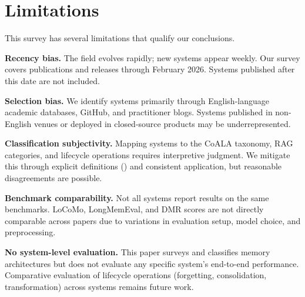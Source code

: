 \section{Limitations}
\label{sec:limitations}

This survey has several limitations that qualify our conclusions.

\textbf{Recency bias.} The field evolves rapidly; new systems appear
weekly. Our survey covers publications and releases through February
2026. Systems published after this date are not included.

\textbf{Selection bias.} We identify systems primarily through
English-language academic databases, GitHub, and practitioner blogs.
Systems published in non-English venues or deployed in closed-source
products may be underrepresented.

\textbf{Classification subjectivity.} Mapping systems to the CoALA
taxonomy, RAG categories, and lifecycle operations requires
interpretive judgment. We mitigate this through explicit definitions
() and consistent application, but reasonable
disagreements are possible.

\textbf{Benchmark comparability.} Not all systems report results on
the same benchmarks. LoCoMo, LongMemEval, and DMR scores are not
directly comparable across papers due to variations in evaluation
setup, model choice, and preprocessing.

\textbf{No system-level evaluation.} This paper surveys and classifies
memory architectures but does not evaluate any specific system's
end-to-end performance. Comparative evaluation of lifecycle operations
(forgetting, consolidation, transformation) across systems remains
future work.
